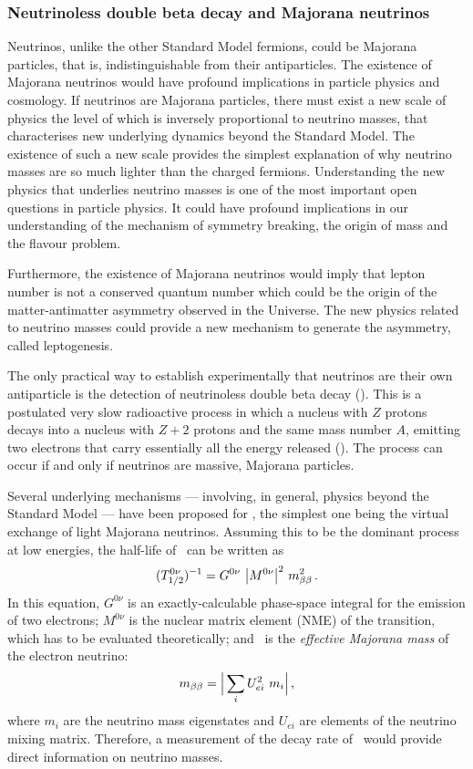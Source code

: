 \subsubsection*{Neutrinoless double beta decay and Majorana neutrinos}

Neutrinos, unlike the other Standard Model fermions, could be Majorana particles, that is, indistinguishable from their antiparticles. The existence of Majorana neutrinos would have profound implications in particle physics and cosmology. If neutrinos are Majorana particles, there must exist a new scale of physics the level of which is inversely proportional to neutrino masses, that characterises new underlying dynamics beyond the Standard Model. The existence of such a new scale provides the simplest explanation of why neutrino masses are so much lighter than the charged fermions. Understanding the new physics that underlies neutrino masses is one of the most important open questions in particle physics. It could have profound implications in our understanding of the mechanism of symmetry breaking, the origin of mass and the flavour problem.

Furthermore, the existence of Majorana neutrinos would imply that lepton number is not a conserved quantum number which could be the origin of the matter-antimatter asymmetry observed in the Universe. The new physics related to neutrino masses could provide a new mechanism to generate the asymmetry, called leptogenesis. 

The only practical way to establish experimentally that neutrinos are their own antiparticle is the detection of neutrinoless double beta decay (\bbonu). This is a postulated very slow radioactive process in which a nucleus with $Z$ protons decays into a nucleus with $Z+2$ protons and the same mass number $A$, emitting two electrons that carry essentially all the energy released (\Qbb). The process can occur if and only if neutrinos are massive, Majorana particles.

Several underlying mechanisms --- involving, in general, physics beyond the Standard Model  --- have been proposed for \bbonu, the simplest one being the virtual exchange of light Majorana neutrinos. Assuming this to be the dominant process at low energies, the half-life of \bbonu\ can be written as
\begin{equation}
(T^{0\nu}_{1/2})^{-1} = G^{0\nu} \ \big|M^{0\nu}\big|^{2} \ \mbb^{2} \, .
\label{eq:Tonu}
\end{equation}
In this equation, $G^{0\nu}$ is an exactly-calculable phase-space integral for the emission of two electrons; $M^{0\nu}$ is the nuclear matrix element (NME) of the transition, which has to be evaluated theoretically; and \mbb\ is the \emph{effective Majorana mass} of the electron neutrino:
\begin{equation}
m_{\beta\beta} = \Big| \sum_{i} U^{2}_{ei} \ m_{i} \Big| \, ,
\end{equation}
where $m_{i}$ are the neutrino mass eigenstates and $U_{ei}$ are elements of the neutrino mixing matrix. Therefore, a measurement of the decay rate of \bbonu\ would provide direct information on neutrino masses.

